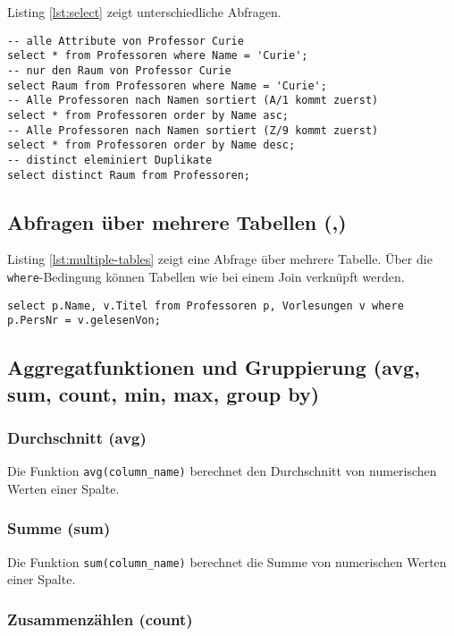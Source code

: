 Listing \ref{lst:select} zeigt unterschiedliche Abfragen.

\begin{lstlisting}[caption={select}, label=lst:select]
-- alle Attribute von Professor Curie
select * from Professoren where Name = 'Curie';
-- nur den Raum von Professor Curie
select Raum from Professoren where Name = 'Curie';
-- Alle Professoren nach Namen sortiert (A/1 kommt zuerst)
select * from Professoren order by Name asc;
-- Alle Professoren nach Namen sortiert (Z/9 kommt zuerst)
select * from Professoren order by Name desc;
-- distinct eleminiert Duplikate
select distinct Raum from Professoren; 
\end{lstlisting}

\subsection{Abfragen über mehrere Tabellen (,)}

Listing \ref{lst:multiple-tables} zeigt eine Abfrage über mehrere Tabelle. Über die \verb|where|-Bedingung können Tabellen wie bei einem Join verknüpft werden.

\begin{lstlisting}[caption={Abfragen über mehrere Tabellen}, label=lst:multiple-tables]
select p.Name, v.Titel from Professoren p, Vorlesungen v where p.PersNr = v.gelesenVon;
\end{lstlisting}

\subsection{Aggregatfunktionen und Gruppierung (avg, sum, count, min, max, group by)}

\subsubsection{Durchschnitt (avg)}

Die Funktion \verb|avg(column_name)| berechnet den Durchschnitt von numerischen Werten einer Spalte.

\subsubsection{Summe (sum)}

Die Funktion \verb|sum(column_name)| berechnet die Summe von numerischen Werten einer Spalte.

\subsubsection{Zusammenzählen (count)}

